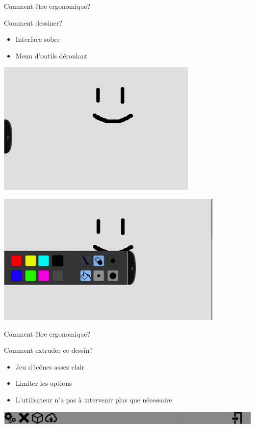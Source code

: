 \documentclass[a4paper,10pt]{beamer}
\begin{document}
		\begin{frame}{Comment être ergonomique?}

				Comment dessiner?
					\begin{itemize}
						\item Interface sobre
						\item Menu d'outils déroulant
					\end{itemize}
				
				\centerline{\includegraphics[scale=0.3]{images/Nono/img1.png}} \centerline{\includegraphics[scale=0.3]{images/Nono/img2.png}}
			


		\end{frame}	
		
		\begin{frame}{Comment être ergonomique?}
			
			Comment extruder ce dessin?
			\begin{itemize}
				\item Jeu d'icônes assez clair
				\item Limiter les options
				\item L'utilisateur n'a pas à intervenir plus que nécessaire
			\end{itemize}
			
			\centerline{\includegraphics[scale=0.5]{images/Nono/img3.png}} 
			
			
			
		\end{frame}	
			
\end{document}
